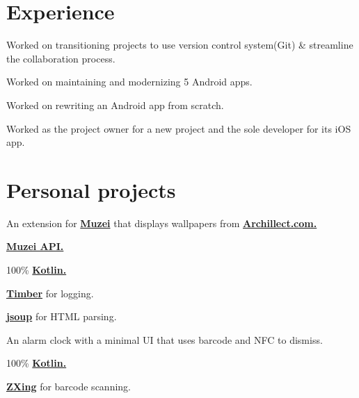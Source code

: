 \documentclass[]{Resume}
\begin{document}
\begin{minipage}[t]{0.66\textwidth} 


\section{Experience}
\vspace{\topsep} %
\begin{tightemize}
\item Worked on transitioning projects to use version control system(Git) \& streamline the collaboration process.
\item Worked on maintaining and modernizing 5 Android apps.
\item Worked on rewriting an Android app from scratch.
\item Worked as the project owner for a new project and the sole developer for its iOS app.
\end{tightemize}
\sectionsep


\section{Personal projects}
An extension for \textbf{\href{http://muzei.co}{Muzei}} that displays wallpapers from \textbf{\href{http://Archillect.com}{Archillect.com.}}
\begin{tightemize}
\item \textbf{\href{http://api.muzei.co}{Muzei API.}}
\item 100\% \textbf{\href{http://kotlinlang.org}{Kotlin.}}
\item \textbf{\href{http://github.com/JakeWharton/timber}{Timber}} for logging.
\item \textbf{\href{http://jsoup.org}{jsoup}} for HTML parsing.
\end{tightemize}
\sectionsep

An alarm clock with a minimal UI that uses barcode and NFC to dismiss.
\begin{tightemize}
\item 100\% \textbf{\href{http://kotlinlang.org}{Kotlin.}}
\item \textbf{\href{http://github.com/zxing/zxing}{ZXing}} for barcode scanning.
\end{tightemize}
\sectionsep


\end{minipage}
\end{document}
